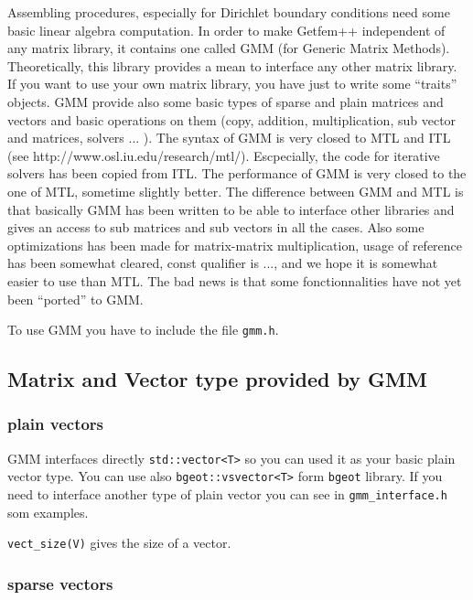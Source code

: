 \documentclass[11pt,a4paper]{article}
\begin{document}
Assembling procedures, especially for Dirichlet boundary conditions need some basic linear algebra computation. In order to make {\sc Getfem++} independent of any matrix library, it contains one called GMM (for Generic Matrix Methods). Theoretically, this library provides a mean to interface any other matrix library. If you want to use your own matrix library, you have just to write some ``traits'' objects. GMM provide also some basic types of sparse and plain matrices and vectors and basic operations on them (copy, addition, multiplication, sub vector and matrices, solvers ... ). The syntax of GMM is very closed to MTL and ITL (see http://www.osl.iu.edu/research/mtl/). Escpecially, the code for iterative solvers has been copied from ITL. The performance of GMM is very closed to the one of MTL, sometime slightly better. The difference between GMM and MTL is that basically GMM has been written to be able to interface other libraries and gives an access to sub matrices and sub vectors in all the cases. Also some optimizations has been made for matrix-matrix multiplication, usage of reference has been somewhat cleared, const qualifier is ..., and we hope it is somewhat easier to use than MTL. The bad news is that some fonctionnalities have not yet been ``ported'' to GMM.

To use GMM you have to include the file {\tt gmm.h}.

\subsection{Matrix and Vector type provided by GMM}

\subsubsection{plain vectors}

GMM interfaces directly {\tt std::vector<T>} so you can used it as your basic plain vector type. You can use also {\tt bgeot::vsvector<T>} form {\tt bgeot} library. If you need to interface another type of plain vector you can see in {\tt gmm_interface.h} som examples.

{\tt vect_size(V)} gives the size of a vector.

\subsubsection{sparse vectors}
\end{document}
